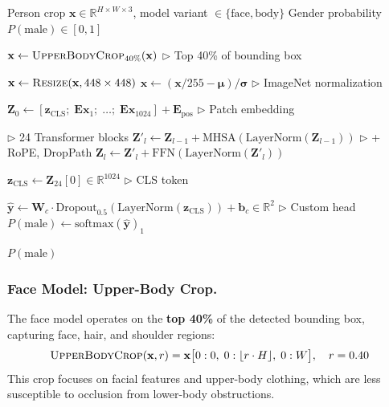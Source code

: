 \documentclass[11pt,a4paper]{article}
\newcommand{\R}{\mathbb{R}}
\newcommand{\softmax}{\mathrm{softmax}}
\newcommand{\layernorm}{\mathrm{LayerNorm}}
\newcommand{\cls}{\mathrm{CLS}}
\begin{document}
\begin{algorithm}[H]
\caption{EVA-02 Large ViT: Gender Classification Forward Pass}\label{alg:gender_forward}
\begin{algorithmic}[1]
\Require Person crop $\mathbf{x} \in \R^{H \times W \times 3}$, model variant $\in \{\text{face}, \text{body}\}$
\Ensure Gender probability $P(\text{male}) \in [0, 1]$

    \State $\mathbf{x} \gets \textsc{UpperBodyCrop}_{40\%}(\mathbf{x})$ \hfill $\triangleright$ Top 40\% of bounding box
\EndIf

\State $\mathbf{x} \gets \textsc{Resize}(\mathbf{x}, 448 \times 448)$
\State $\mathbf{x} \gets (\mathbf{x}/255 - \boldsymbol{\mu}) / \boldsymbol{\sigma}$ \hfill $\triangleright$ ImageNet normalization

\State $\mathbf{Z}_0 \gets [\mathbf{z}_{\cls};\; \mathbf{E}\mathbf{x}_1;\; \ldots;\; \mathbf{E}\mathbf{x}_{1024}] + \mathbf{E}_{\text{pos}}$ \hfill $\triangleright$ Patch embedding

 \hfill $\triangleright$ 24 Transformer blocks
    \State $\mathbf{Z}'_l \gets \mathbf{Z}_{l-1} + \text{MHSA}(\layernorm(\mathbf{Z}_{l-1}))$ \hfill $\triangleright$ + RoPE, DropPath
    \State $\mathbf{Z}_l \gets \mathbf{Z}'_l + \text{FFN}(\layernorm(\mathbf{Z}'_l))$
\EndFor

\State $\mathbf{z}_{\cls} \gets \mathbf{Z}_{24}[0] \in \R^{1024}$ \hfill $\triangleright$ CLS token

\State $\hat{\mathbf{y}} \gets \mathbf{W}_c \cdot \text{Dropout}_{0.5}(\layernorm(\mathbf{z}_{\cls})) + \mathbf{b}_c \in \R^2$ \hfill $\triangleright$ Custom head
\State $P(\text{male}) \gets \softmax(\hat{\mathbf{y}})_1$

\State \Return $P(\text{male})$
\end{algorithmic}
\end{algorithm}


\subsubsection{Face Model: Upper-Body Crop.}
The face model operates on the \textbf{top 40\%} of the detected bounding box, capturing face, hair, and shoulder regions:
\begin{equation}
\textsc{UpperBodyCrop}(\mathbf{x}, r) = \mathbf{x}\bigl[0:0,\; 0:\lfloor r \cdot H \rfloor,\; 0:W\bigr], \quad r = 0.40
\label{eq:upper_crop}
\end{equation}
This crop focuses on facial features and upper-body clothing, which are less susceptible to occlusion from lower-body obstructions.
\end{document}
